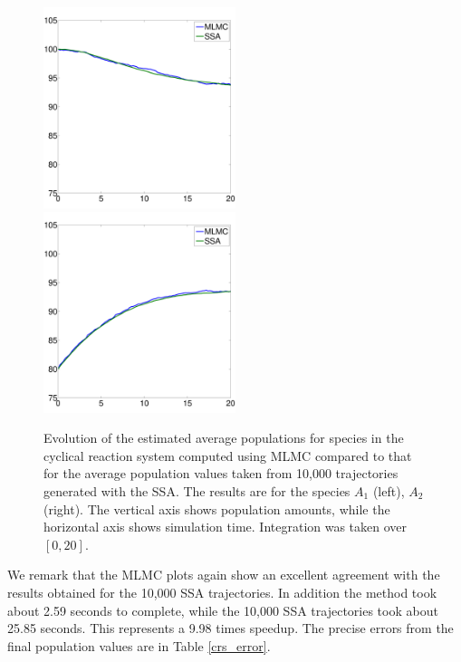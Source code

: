 \documentclass[ugrad,lot,lof,openright,11pt,oneside,onehalfspace]{RUthesis}
\begin{document}
			\begin{figure}[H]
			\centerline{
				\includegraphics[width=0.5\textwidth]{figures/CRS_a1_mlmc.pdf}
				\includegraphics[width=0.5\textwidth]{figures/CRS_a2_mlmc.pdf}
				}
			\captionsetup{width=0.8\textwidth}
			\caption[Estimated average population values for species in Cyclical Reaction System using MLMC compared to 10,000 SSA trajectories  over {$[0,20]$}]{Evolution of the estimated average populations for species in the cyclical reaction system computed using MLMC compared to that for the average population values taken from 10,000 trajectories generated with the SSA. The results are for the species $A_1$ (left), $A_2$ (right). The vertical axis shows population amounts, while the horizontal axis shows simulation time. Integration was taken over $[0,20]$.}
			\label{crs_mlmc}
			\end{figure}
			
			\noindent
			We remark that the MLMC plots again show an excellent agreement with the results obtained for the 10,000 SSA trajectories. In addition the method took about 2.59 seconds to complete, while the 10,000 SSA trajectories took about 25.85 seconds. This represents a 9.98 times speedup. The precise errors from the final population values are in Table \ref{crs_error}.
\end{document}
